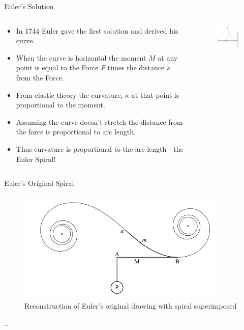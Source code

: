 \documentclass{beamer}
\begin{document}
\begin{frame}{Euler's Solution}
	\begin{columns}
		\begin{column}{0.6\textwidth}
			\begin{itemize}
				\item In 1744 Euler gave the first solution and derived his curve. 
				\item When the curve is horizontal the moment $M$ at any point is equal to the Force $F$ times the distance $s$ from the Force.
				\item From elastic theory the curvature, $\kappa$ at that point is proportional to the moment.
				\item Assuming the curve doesn't stretch the distance from the force is proportional to arc length.
				\item Thus curvature is proportional to the arc length - the Euler Spiral!
			\end{itemize}
		\end{column}
		\begin{column}{0.4\textwidth}
			\begin{figure}[htp]
				\centering
				\includegraphics[width=50mm, scale=0.5]{elasticity_problem_Euler_Bernard.png}
			\end{figure}
		\end{column}
	\end{columns}
\end{frame}

\begin{frame}{Euler's Original Spiral}
	\begin{figure}[htp]
		\caption{Reconstruction of Euler's original drawing with spiral superimposed}
		\centering
		\includegraphics[width=100mm, scale=0.5]{Eulers_original.png}
	\end{figure}..
\end{frame}
\end{document}
